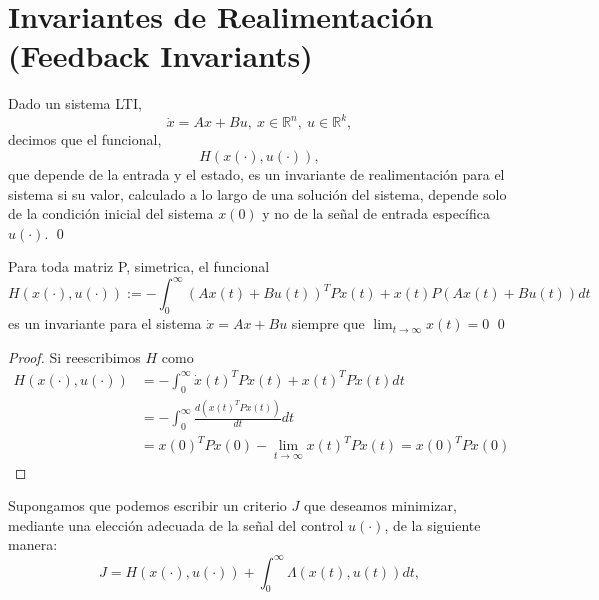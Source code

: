 \section{Invariantes de Realimentación (Feedback Invariants)}
\begin{definition}
Dado un sistema LTI,
\begin{equation*}
\dot{x} =Ax+Bu,\ x \in \mathbb{R}^n,\ u \in \mathbb{R}^k,
\end{equation*}
decimos que el funcional,
\begin{equation*}
H\left(x(\cdot),u(\cdot)\right),
\end{equation*}
que depende de la entrada y el estado, es un invariante de realimentación para el sistema si su valor, calculado a lo largo de una solución del sistema, depende solo de la condición inicial del sistema $x(0)$ y no de la señal de entrada específica $u(\cdot)$.
\qed
\end{definition}

\begin{lemma}
Para toda matriz P, simetrica, el funcional
\begin{equation}\label{eq.fin}
H\left(x(\cdot),u(\cdot)\right):=-\int_0^{\infty}\left(Ax(t)+Bu(t)\right)^TPx(t)+x(t)P\left(Ax(t)+Bu(t)\right)dt
\end{equation}
es un invariante para el sistema $\dot{x} = Ax+Bu$ siempre que $\lim_{t\rightarrow \infty} x(t)= 0$
\qed
\end{lemma}
\begin{proof}
Si reescribimos $H$ como
\begin{equation*}
\begin{split}
H\left(x(\cdot),u(\cdot)\right) &= -\int_0^{\infty}\dot{x}(t)^TPx(t)+x(t)^TP\dot{x}(t)dt\\
&= -\int_0^{\infty}\frac{d\left(x(t)^TPx(t)\right)}{dt}dt\\
&=x(0)^TPx(0) -\lim_{t\rightarrow \infty} x(t)^TPx(t) = x(0)^TPx(0)
\end{split}
\end{equation*}
\end{proof}

Supongamos que podemos escribir un criterio $J$ que deseamos minimizar, mediante una elección adecuada de la señal del control $u(\cdot)$, de la siguiente manera:
\begin{equation}\label{eq:jmin}
J = H\left(x(\cdot),u(\cdot)\right) + \int_0^{\infty} \Lambda \left(x(t),u(t)\right)dt,
\end{equation}

